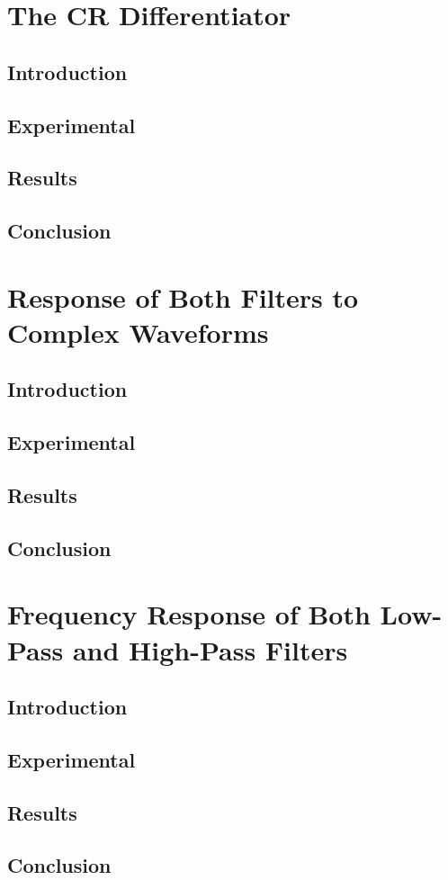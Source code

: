\documentclass[11pt]{article}
\begin{document}

\section{The CR Differentiator}
\subsection{Introduction}

\subsection{Experimental}

\subsection{Results}

\subsection{Conclusion}


\section{Response of Both Filters to Complex Waveforms }
\subsection{Introduction}

\subsection{Experimental}

\subsection{Results}

\subsection{Conclusion}


\section{Frequency Response of Both Low-Pass and High-Pass Filters}
\subsection{Introduction}

\subsection{Experimental}

\subsection{Results}

\subsection{Conclusion}
\end{document}
